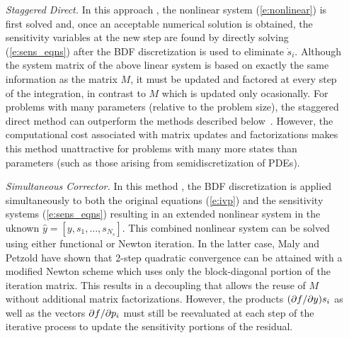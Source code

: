 \begin{itemize}

\item[{\em Staggered Direct.}]
  In this approach \cite{CaSt:85}, the nonlinear system (\ref{e:nonlinear}) is first 
  solved and, once an acceptable numerical solution is obtained, the sensitivity 
  variables at the new step are found by directly solving (\ref{e:sens_eqns}) 
  after the BDF discretization is used to eliminate ${\dot s}_i$. 
  Although the system matrix of the above linear system is based on exactly the same 
  information as the matrix $M$, it must be updated and factored 
  at every step of the integration, in contrast to $M$ which is updated only ocasionally. 
  For problems with many parameters (relative to the problem size), the staggered direct 
  method can outperform the methods described below~\cite{LPZ:99}.
  However, the computational cost associated with matrix updates and factorizations 
  makes this method unattractive for problems with many more states than parameters
  (such as those arising from semidiscretization of PDEs).
  
\item[{\em Simultaneous Corrector.}] 
  In this method \cite{MaPe:96}, the BDF discretization is applied simultaneously
  to both the original equations (\ref{e:ivp}) and the sensitivity systems
  (\ref{e:sens_eqns}) resulting in an extended nonlinear system 
  in the uknown ${\hat y} = [y, s_1, \ldots , s_{N_s}]$.
  This combined nonlinear system can be solved using either functional or
  Newton iteration. In the latter case, Maly and Petzold have shown
  that 2-step quadratic convergence can be attained with a modified Newton scheme
  which uses only the block-diagonal portion of the iteration matrix.
  This results in a decoupling that allows the reuse of 
  $M$ without additional matrix factorizations. However, the products
  $(\partial f / \partial y)s_i$ as well as the vectors $\partial f / \partial p_i$ must still be reevaluated at 
  each step of the iterative process to update the 
  sensitivity portions of the residual.
  

\end{itemize}
